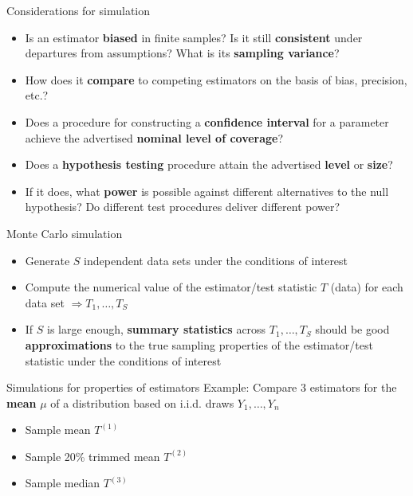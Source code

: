 \documentclass[
  ignorenonframetext,
]{beamer}
\providecommand{\tightlist}{%
  \setlength{\itemsep}{0pt}\setlength{\parskip}{0pt}}
\begin{document}
\begin{frame}{Considerations for simulation}
\protect{}\label{considerations-for-simulation}
\begin{itemize}
\tightlist
\item
  Is an estimator \textbf{biased} in finite samples? Is it still
  \textbf{consistent} under departures from assumptions? What is its
  \textbf{sampling variance}?
\item
  How does it \textbf{compare} to competing estimators on the basis of
  bias, precision, etc.? \pause
\item
  Does a procedure for constructing a \textbf{confidence interval} for a
  parameter achieve the advertised \textbf{nominal level of coverage}?
\item
  Does a \textbf{hypothesis testing} procedure attain the advertised
  \textbf{level} or \textbf{size}?
\item
  If it does, what \textbf{power} is possible against different
  alternatives to the null hypothesis? Do different test procedures
  deliver different power?
\end{itemize}
\end{frame}

\begin{frame}{Monte Carlo simulation}
\protect{}\label{monte-carlo-simulation}
\begin{itemize}
\tightlist
\item
  Generate \(S\) independent data sets under the conditions of interest
\item
  Compute the numerical value of the estimator/test statistic \(T\)
  (data) for each data set \(\Rightarrow T_{1}, \ldots, T_{S}\)
\item
  If \(S\) is large enough, \textbf{summary statistics} across
  \(T_{1}, \ldots, T_{S}\) should be good \textbf{approximations} to the
  true sampling properties of the estimator/test statistic under the
  conditions of interest
\end{itemize}
\end{frame}

\begin{frame}{Simulations for properties of estimators}
\protect{}\label{simulations-for-properties-of-estimators}
Example: Compare 3 estimators for the \textbf{mean} \(\mu\) of a
distribution based on i.i.d. draws \(Y_{1}, \ldots, Y_{n}\)

\begin{itemize}
\tightlist
\item
  Sample mean \(T^{(1)}\)
\item
  Sample 20\% trimmed mean \(T^{(2)}\)
\item
  Sample median \(T^{(3)}\)
\end{itemize}
\end{frame}
\end{document}
